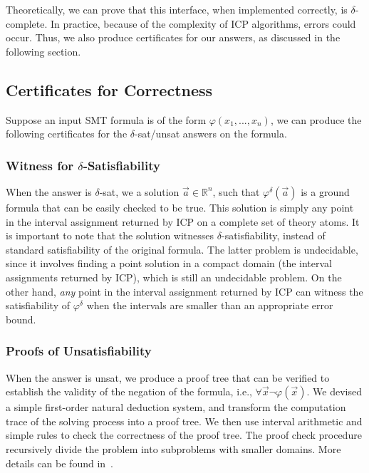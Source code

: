 \documentclass[envcountsect]{llncs}
\begin{document}
Theoretically, we can prove that this interface, when implemented correctly, is
$\delta$-complete. In practice, because of the complexity of ICP algorithms,
errors could occur. Thus, we also produce certificates for our answers, as
discussed in the following section.

\subsection{Certificates for Correctness}

Suppose an input SMT formula is of the form $\varphi(x_1,...,x_n)$, we can
produce the following certificates for the {\sf $\delta$-sat/unsat} answers on
the formula.

\subsubsection{Witness for $\delta$-Satisfiability} When the answer is
{\sf $\delta$-sat}, we a solution $\vec a\in \mathbb{R}^n$, such
that $\varphi^{\delta}(\vec a)$ is a ground formula that can be easily checked
to be true. This solution is simply any point in the interval assignment
returned
by ICP on a complete set of theory atoms. It is important to note that the
solution witnesses $\delta$-satisfiability, instead of standard satisfiability
of the original formula. The latter problem is undecidable, since it involves
finding a point solution in a compact domain (the interval assignments returned
by ICP), which is still an undecidable problem. On the other hand, {\em any}
point in the interval assignment returned by ICP can witness the satisfiability
of $\varphi^{\delta}$ when the intervals are smaller than an appropriate error
bound.

\subsubsection{Proofs of Unsatisfiability} When the answer is {\sf unsat}, we
produce a proof tree that can be verified to establish the validity of the
negation of the formula, i.e., $\forall \vec x \neg\varphi(\vec x)$. We
devised a simple first-order natural deduction system, and transform the
computation trace of the solving process into a proof tree. We then use
interval arithmetic and simple rules to check the correctness of the proof
tree. The proof check procedure recursively divide the problem into subproblems
with smaller domains. More details can be found in~\cite{cade2013extended}.
\end{document}
